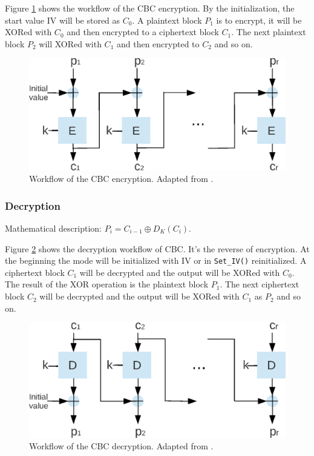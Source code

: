 Figure \ref{CBCEN} shows the workflow of the CBC encryption.  By the
initialization, the start value IV will be stored as $C_0$. A
plaintext block $P_1$ is to encrypt, it will be XORed with $C_0$ and
then encrypted to a ciphertext block $C_1$. The next plaintext block
$P_2$ will XORed with $C_1$ and then encrypted to $C_2$ and so on.
\begin{figure}[h]
\centering
\includegraphics[scale=0.8]{./images/CBC_En}
\caption{Workflow of the CBC encryption. Adapted from
  \cite{DBLP:reference/crypt/2011}.}\label{CBCEN}
\end{figure}
\subsubsection*{Decryption}
Mathematical description: $P_i=C_{i-1}\oplus D_K(C_i)$.

Figure \ref{CBCDE} shows the decryption workflow of CBC. It's the
reverse of encryption. At the beginning the mode will be initialized
with IV or in \texttt{Set\_IV()} reinitialized. A ciphertext block
$C_1$ will be decrypted and the output will be XORed with $C_0$. The
result of the XOR operation is the plaintext block $P_1$. The next
ciphertext block $C_2$ will be decrypted and the output will be XORed
with $C_1$ as $P_2$ and so on.
\begin{figure}[h]
\centering
\includegraphics[scale=0.8]{./images/CBC_De}
\caption{Workflow of the CBC decryption. Adapted from
  \cite{DBLP:reference/crypt/2011}.}\label{CBCDE}
\end{figure}

